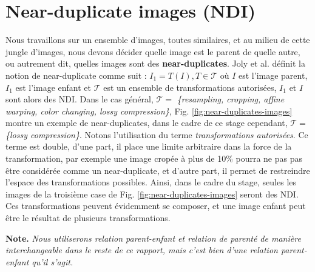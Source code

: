 \documentclass[utf8]{stageM2R} %
\begin{document}
\section{Near-duplicate images (NDI)}
\label{subsec:ndi}
Nous travaillons sur un ensemble d'images, toutes similaires, et au milieu de cette jungle d'images, nous devons décider quelle image est le parent de quelle autre, ou autrement dit, quelles images sont des \textbf{near-duplicates}. Joly et al. \cite{joly2007content} définit la notion de near-duplicate comme suit : $I_{1} = T(I), T \in \mathcal{T}$ où $I$ est l'image parent, $I_{1}$ est l'image enfant et $\mathcal{T}$ est un ensemble de transformations autorisées, $I_{1}$ et $I$ sont alors des NDI. Dans le cas général, $\mathcal{T} = $ \textit{\{resampling, cropping, affine warping, color changing, lossy compression\}}, Fig. \ref{fig:near-duplicates-images} montre un exemple de near-duplicates, dans le cadre de ce stage cependant, $\mathcal{T} = $ \textit{\{lossy compression\}}. Notons l'utilisation du terme \textit{transformations autorisées}. Ce terme est double, d'une part, il place une limite arbitraire dans la force de la transformation, par exemple une image cropée à plus de 10\% pourra ne pas pas être considérée comme un near-duplicate, et d'autre part, il permet de restreindre l'espace des transformations possibles. Ainsi, dans le cadre du stage, seules les images de la troisième case de Fig. \ref{fig:near-duplicates-images} seront des NDI. Ces transformations peuvent évidemment se composer, et une image enfant peut être le résultat de plusieurs transformations.

\vspace{5mm}
\textbf{Note.} \textit{Nous utiliserons relation parent-enfant et relation de parenté de manière interchangeable dans le reste de ce rapport, mais c'est bien d'une relation parent-enfant qu'il s'agit.}
\end{document}
